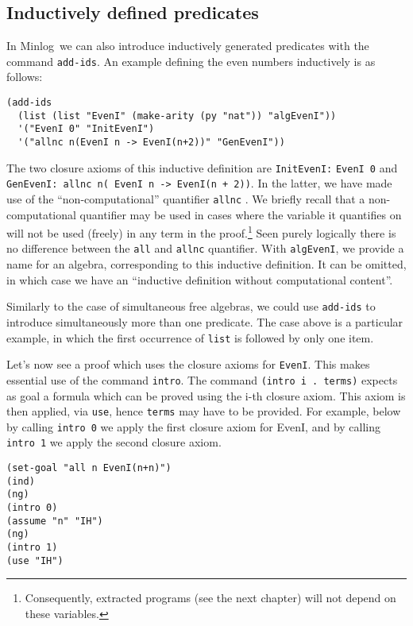 \documentclass[12pt]{amsart}
\newcommand{\inquotes}[1]{``#1''}
\newcommand{\mi}{Minlog}
\begin{document}
\subsection{Inductively defined predicates}
\label{EvenI}
In \mi\ we can also introduce inductively generated predicates with
the command \texttt{add-ids}.  An example defining the even numbers
inductively is as follows:
\begin{verbatim}
(add-ids
  (list (list "EvenI" (make-arity (py "nat")) "algEvenI"))
  '("EvenI 0" "InitEvenI")
  '("allnc n(EvenI n -> EvenI(n+2))" "GenEvenI"))
\end{verbatim}
The two closure axioms of this inductive definition are
\texttt{InitEvenI:} \texttt{EvenI 0} and \texttt{GenEvenI: allnc n(
  EvenI n -> EvenI(n + 2))}.  In the latter, we have made use of the
\inquotes{non-computational} quantifier \texttt{allnc}%
.  We briefly recall that a
non-computational quantifier may be used in cases where the variable
it quantifies on will not be used (freely) in any term in the
proof.\footnote{Consequently, extracted programs (see the next
  chapter) will not depend on these variables.}  Seen purely logically
there is no difference between the \texttt{all} and \texttt{allnc}
quantifier.  With \texttt{algEvenI}, we provide a name for an algebra,
corresponding to this inductive definition.  It can be omitted, in
which case we have an \inquotes{inductive definition without
  computational content}.

Similarly to the case of simultaneous free algebras, we could use
\texttt{add-ids} to introduce simultaneously more than one predicate.
The case above is a particular example, in which the first occurrence
of \texttt{list} is followed by only one item.

Let's now see a proof which uses the closure axioms for
\texttt{EvenI}.  This makes essential use of the command
\texttt{intro}.  The command
\texttt{(intro i .\ terms)} expects as goal a formula which can be
proved using the i-th closure axiom.  This axiom is then applied, via
\texttt{use}, hence \texttt{terms} may have to be provided.  For
example, below by calling \texttt{intro 0} we apply the first closure
axiom for EvenI, and by calling \texttt{intro 1} we apply the second
closure axiom.
\begin{verbatim}
(set-goal "all n EvenI(n+n)")
(ind)
(ng)
(intro 0)
(assume "n" "IH")
(ng)
(intro 1)
(use "IH")
\end{verbatim}
\end{document}
